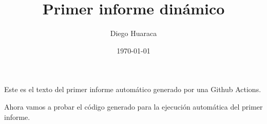 \documentclass[12pt, a4paper]{book}
\title{Primer informe dinámico}
\author{Diego Huaraca}
\date{\today}
\begin{document}
\maketitle

Este es el texto del primer informe automático generado por una Github Actions.\newline

Ahora vamos a probar el código generado para la ejecución automática del primer informe.
\end{document}
